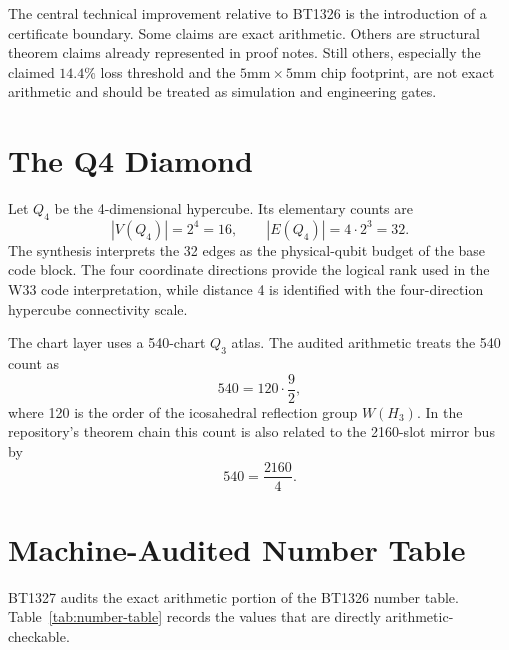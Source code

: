 \documentclass[11pt]{article}
\newcommand{\Qfour}{Q_4}
\newcommand{\Qthree}{Q_3}
\begin{document}
The central technical improvement relative to BT1326 is the introduction of a certificate boundary.  Some claims are exact arithmetic.  Others are structural theorem claims already represented in proof notes.  Still others, especially the claimed \(14.4\%\) loss threshold and the \(5\text{mm}\times 5\text{mm}\) chip footprint, are not exact arithmetic and should be treated as simulation and engineering gates.

\section{The Q4 Diamond}

Let \(\Qfour\) be the 4-dimensional hypercube.  Its elementary counts are
\[
|V(\Qfour)|=2^4=16,
\qquad
|E(\Qfour)|=4\cdot 2^3=32.
\]
The synthesis interprets the 32 edges as the physical-qubit budget of the base code block.  The four coordinate directions provide the logical rank used in the W33 code interpretation, while distance 4 is identified with the four-direction hypercube connectivity scale.

The chart layer uses a 540-chart \(\Qthree\) atlas.  The audited arithmetic treats the 540 count as
\[
540 = 120\cdot \frac{9}{2},
\]
where 120 is the order of the icosahedral reflection group \(W(H_3)\).  In the repository's theorem chain this count is also related to the 2160-slot mirror bus by
\[
540 = \frac{2160}{4}.
\]

\section{Machine-Audited Number Table}

BT1327 audits the exact arithmetic portion of the BT1326 number table.  Table~\ref{tab:number-table} records the values that are directly arithmetic-checkable.
\end{document}
